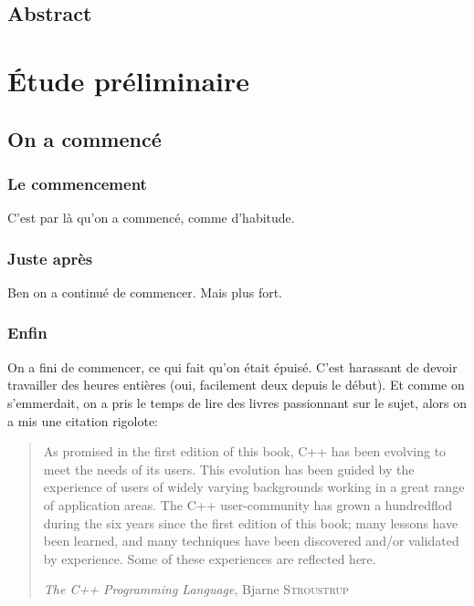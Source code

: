 \documentclass[french,12pt, a4paper,twoside,openright]{report}
\begin{document}
\chapter*{Abstract}

\part{\'Etude pr\'eliminaire}

\chapter{On a commenc\'e}

\section{Le commencement}

C'est par l\`a qu'on a commenc\'e, comme d'habitude.

\section{Juste apr\`es}

Ben on a continu\'e de commencer. Mais plus fort.

\section{Enfin}

On a fini de commencer, ce qui fait qu'on \'etait \'epuis\'e. C'est harassant de
devoir travailler des heures enti\`eres (oui, facilement deux depuis le d\'ebut).
Et comme on s'emmerdait, on a pris le temps de lire des livres passionnant sur
le sujet, alors on a mis une citation rigolote:

\begin{quote}\small
As promised in the first edition of this book, C++ has been evolving to meet
the needs of its users. This evolution has been guided by the experience of
users of widely varying backgrounds working in a great range of application
areas. The C++ user-community has grown a hundredflod during the six years
since the first edition of this book; many lessons have been learned, and
many techniques have been discovered and/or validated by experience. Some of
these experiences are reflected here.

\hfill \textit{The C++ Programming Language}, Bjarne \textsc{Stroustrup}
\end{quote}
\end{document}
